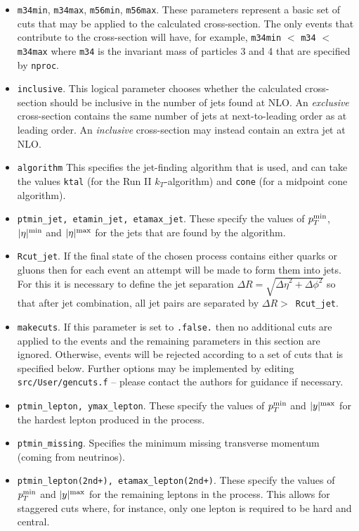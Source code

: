 \documentclass[12pt]{article}
\begin{document}
\begin{itemize}
\begin{center}
\{blank line\} \\
{\tt [Jet definition and event cuts] }
\end{center}

\item {\tt m34min}, {\tt m34max}, {\tt m56min}, {\tt m56max}.
These parameters represent a basic set of cuts that may be applied
to the calculated cross-section. The only events that contribute to
the cross-section will have, for example,
{\tt m34min} $<$ {\tt m34} $<$ {\tt m34max} where {\tt m34} is the
invariant mass of particles 3 and 4 that are specified by {\tt nproc}.

\item {\tt inclusive}.  This logical parameter chooses whether the
calculated cross-section should be inclusive in the number of jets
found at NLO. An {\em exclusive}
cross-section contains the same number of jets at next-to-leading
order as at leading order. An {\em inclusive} cross-section may
instead contain an extra jet at NLO.

\item {\tt algorithm} This specifies the jet-finding algorithm that
is used, and can take the values
{\tt ktal} (for the Run II $k_T$-algorithm) and {\tt cone} (for
a midpoint cone algorithm).

\item {\tt ptmin\_jet, etamin\_jet, etamax\_jet}. These specify the values
of $p_T^{\rm min}$, $|\eta|^{\rm min}$ and $|\eta|^{\rm max}$ for the
jets that are found by the algorithm. 

\item {\tt Rcut\_jet}. If the final state of the chosen process contains
either quarks or gluons then for each event an attempt will be made
to form them into jets. For this it is necessary to define the
jet separation $\Delta R=\sqrt{{\Delta \eta}^2 + {\Delta \phi}^2}$
so that after jet combination, all jet pairs are separated by
$\Delta R >$~{\tt Rcut\_jet}.

\item {\tt makecuts}. If this parameter is set to {\tt .false.} then
no additional cuts are applied to the events and the remaining
parameters in this section are ignored. Otherwise, events will
be rejected according to a set of cuts that is specified below.
Further options may be implemented by editing {\tt src/User/gencuts.f}
-- please contact the authors for guidance if necessary.

\item {\tt ptmin\_lepton, ymax\_lepton}. These specify the values
of $p_T^{\rm min}$ and $|y|^{\rm max}$ for the hardest lepton produced
in the process.
\item {\tt ptmin\_missing}. Specifies the minimum missing transverse
momentum (coming from neutrinos).
\item {\tt ptmin\_lepton(2nd+), etamax\_lepton(2nd+)}. These specify
the values of $p_T^{\rm min}$ and $|y|^{\rm max}$ for the remaining
leptons in the process. This allows for staggered cuts where, for
instance, only one lepton is required to be hard and central.


\end{itemize}
\end{document}
